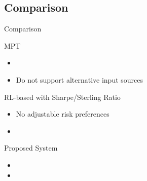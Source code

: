 \subsection{Comparison}
\begin{frame}{Comparison}
    \begin{block}{MPT}
        \begin{itemize}
            \item \color{blue}{Adjustable risk preferences}
            \item\alert{Do not support alternative input sources}
        \end{itemize}
    \end{block}
    \begin{block}{RL-based with Sharpe/Sterling Ratio}
        \begin{itemize}    
            \item \alert{No adjustable risk preferences}
            \item \color{blue}{Support alternative input sources}    
        \end{itemize}            
    \end{block}

    \begin{block}{Proposed System}
        \begin{itemize}
        \item \color{blue}{Adjustable risk preferences}
        \item \color{blue}{Support alternative input sources}  
        \end{itemize}        
    \end{block}

\end{frame}